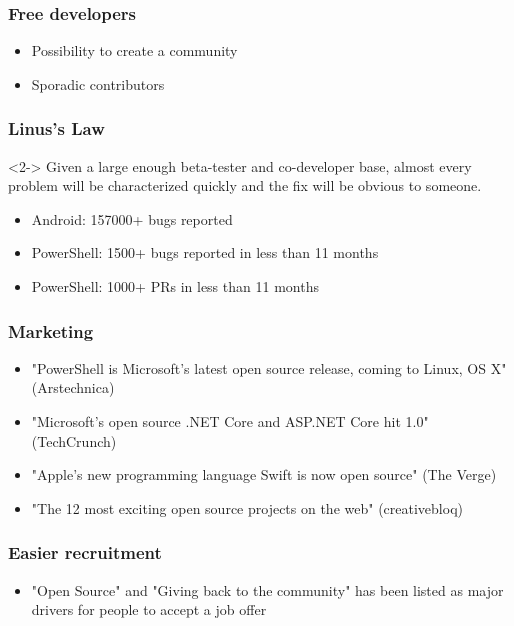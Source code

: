 \documentclass[t,aspectratio=169]{beamer}
\begin{document}
\begin{frame}
    \frametitle{Free developers}
    \begin{itemize}
        \item<2-> Possibility to create a community
        \item<3-> Sporadic contributors
    \end{itemize}
\end{frame}

\begin{frame}
    \frametitle{Linus's Law}
    \begin{definition}<2->
        Given a large enough beta-tester and co-developer base, almost every problem will be characterized quickly and the fix will be obvious to someone.
    \end{definition}
    \begin{itemize}
        \item<3-> Android: 157000+ bugs reported
        \item<4-> PowerShell: 1500+ bugs reported in less than 11 months
        \item<5-> PowerShell: 1000+ PRs in less than 11 months
    \end{itemize}
\end{frame}

\begin{frame}
    \frametitle{Marketing}
    \begin{itemize}
        \item<2-> "PowerShell is Microsoft’s latest open source release, coming to Linux, OS X" (Arstechnica)
        \item<3-> "Microsoft’s open source .NET Core and ASP.NET Core hit 1.0" (TechCrunch)
        \item<4-> "Apple's new programming language Swift is now open source" (The Verge) 
        \item<5-> "The 12 most exciting open source projects on the web" (creativebloq)
    \end{itemize}
\end{frame}

\begin{frame}
    \frametitle{Easier recruitment}
    \begin{itemize}
        \item<2-> "Open Source" and "Giving back to the community" has been listed as major drivers for people to accept a job offer
    \end{itemize}
\end{frame}
\end{document}
